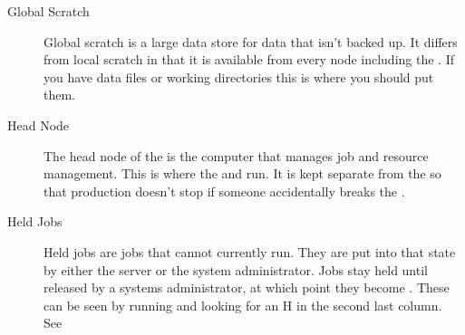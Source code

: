 \documentclass[letterpaper,10pt,english]{sphinxmanual}
\begin{document}
\begin{description}
\item[{Global Scratch\label{\detokenize{glossary:term-Global-Scratch}}}] \leavevmode
Global scratch is a large data store for data that isn’t backed up. It differs from local scratch in that it is available from every node including the {\hyperref[\detokenize{glossary:term-Head-Node}]{}}. If you have data files or working directories this is where you should put them.

\item[{Head Node\label{\detokenize{glossary:term-Head-Node}}}] \leavevmode
The head node of the {\hyperref[\detokenize{glossary:term-Cluster}]{}} is the computer that manages job and resource management. This is where the {\hyperref[\detokenize{glossary:term-Job-Scheduler}]{}} and {\hyperref[\detokenize{glossary:term-Resource-Manager}]{}} run. It is kept separate from the {\hyperref[\detokenize{glossary:term-Login-Node}]{}} so that production doesn’t stop if someone accidentally breaks the {\hyperref[\detokenize{glossary:term-Login-Node}]{}}.

\item[{Held Jobs\label{\detokenize{glossary:term-Held-Jobs}}}] \leavevmode
Held jobs are jobs that cannot currently run. They are put into that state by either the server or the system administrator. Jobs stay held until released by a systems administrator, at which point they become {\hyperref[\detokenize{glossary:term-Queued-Jobs}]{}}. These can be seen by running  and looking for an H in the second last column. See {\hyperref[\detokenize{using_katana/running_jobs:more-info-from-pbs}]{}}


\end{description}
\end{document}
